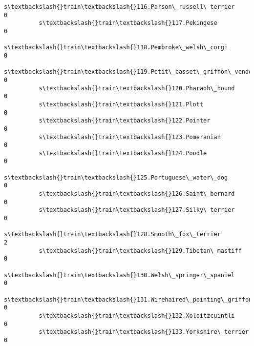 \documentclass[11pt]{article}
\begin{document}
\begin{Verbatim}[commandchars=\\\{\}]
          s\textbackslash{}train\textbackslash{}116.Parson\_russell\_terrier                                           0   
          s\textbackslash{}train\textbackslash{}117.Pekingese                                                        0   
          s\textbackslash{}train\textbackslash{}118.Pembroke\_welsh\_corgi                                             0   
          s\textbackslash{}train\textbackslash{}119.Petit\_basset\_griffon\_vendeen                                     0   
          s\textbackslash{}train\textbackslash{}120.Pharaoh\_hound                                                    0   
          s\textbackslash{}train\textbackslash{}121.Plott                                                            0   
          s\textbackslash{}train\textbackslash{}122.Pointer                                                          0   
          s\textbackslash{}train\textbackslash{}123.Pomeranian                                                       0   
          s\textbackslash{}train\textbackslash{}124.Poodle                                                           0   
          s\textbackslash{}train\textbackslash{}125.Portuguese\_water\_dog                                             0   
          s\textbackslash{}train\textbackslash{}126.Saint\_bernard                                                    0   
          s\textbackslash{}train\textbackslash{}127.Silky\_terrier                                                    0   
          s\textbackslash{}train\textbackslash{}128.Smooth\_fox\_terrier                                               2   
          s\textbackslash{}train\textbackslash{}129.Tibetan\_mastiff                                                  0   
          s\textbackslash{}train\textbackslash{}130.Welsh\_springer\_spaniel                                           0   
          s\textbackslash{}train\textbackslash{}131.Wirehaired\_pointing\_griffon                                      0   
          s\textbackslash{}train\textbackslash{}132.Xoloitzcuintli                                                   0   
          s\textbackslash{}train\textbackslash{}133.Yorkshire\_terrier                                                0   
          

\end{Verbatim}
\end{document}
